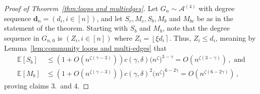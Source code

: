 \documentclass[12pt]{article}
\theoremstyle{definition}
\theoremstyle{remark}
\theoremstyle{remark}
\numberwithin{theorem}{section}
\newcommand{\E}[1]{{\mathbb E}\left[#1\right]}
\newcommand{\abcdFour}{\ensuremath{\mathcal{A}^{(4)}}}
\newcommand{\round}[1]{\ensuremath{\left\lfloor #1 \right\rceil}}
\begin{document}
\begin{proof}[Proof of Theorem~\ref{thm:loops and multiedges}]
Let $G_n \sim \abcdFour$ with degree sequence $\textbf{d}_n = (d_i, i \in [n])$, and let $S_c, M_c, S_b, M_b$ and $M_{bc}$ be as in the statement of the theorem. Starting with $S_b$ and $M_b$, note that the degree sequence in $G_{n,0}$ is $(Z_i, i \in [n])$ where $Z_i = \round{\xi d_i}$. Thus, $Z_i \leq d_i$, meaning by Lemma~\ref{lem:community loops and multi-edges} that
\begin{align*}
\E{S_b} &\leq \left(1 + O(n^{\zeta(\gamma-3)}) \right) c(\gamma,\delta) \big(n^\zeta \big)^{3-\gamma} = O(n^{\zeta(3-\gamma)}) \,, \text{ and}\\
\E{M_b} &\leq \left(1 + O(n^{\zeta(\gamma-3)}) \right) c(\gamma,\delta)^2 \big(n^\zeta\big)^{6-2\gamma} = O(n^{\zeta(6-2\gamma)}) \,,
\end{align*}
proving claims 3.\ and 4. 


\end{proof}
\end{document}
